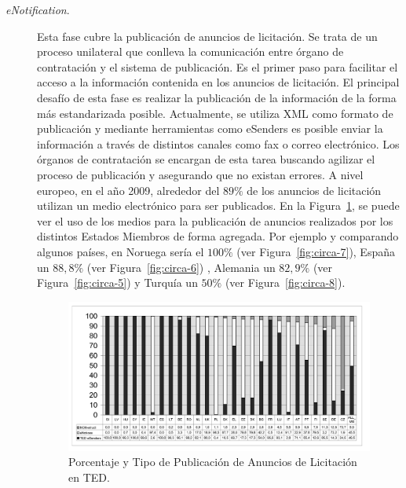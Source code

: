 \begin{description}

 \item [\textit{eNotification}.] Esta fase cubre la publicación de anuncios de licitación. Se trata
de un proceso unilateral que conlleva la comunicación entre órgano de contratación y el sistema
de publicación. Es el primer paso para facilitar el acceso a la información contenida
en los anuncios de licitación. El principal desafío de esta fase es realizar la publicación
de la información de la forma más estandarizada posible. Actualmente, se utiliza XML como 
formato de publicación y mediante herramientas como eSenders es posible enviar la información
a través de distintos canales como fax o correo electrónico. Los órganos de contratación 
se encargan de esta tarea buscando agilizar el proceso de publicación y asegurando
que no existan errores. A nivel europeo, en el año 2009, alrededor del $89\%$ de los anuncios de licitación
utilizan un medio electrónico para ser publicados. En la Figura~\ref{fig:circa-1}, se puede ver el uso 
de los medios para la publicación de anuncios realizados por los distintos Estados Miembros de forma agregada. Por ejemplo y comparando algunos países, 
en Noruega sería el $100\%$ (ver Figura~\ref{fig:circa-7}), España un $88,8\%$  (ver Figura~\ref{fig:circa-6}) , Alemania un $82,9\%$ 
(ver Figura~\ref{fig:circa-5}) y Turquía un $50\%$ (ver Figura~\ref{fig:circa-8}).


\begin{figure}[!htb]
\centering
	\includegraphics[width=16cm]{images/phd/eproc/circa-1}
\caption{Porcentaje y Tipo de Publicación de Anuncios de Licitación en TED.}
\label{fig:circa-1}
\end{figure}



\end{description}

